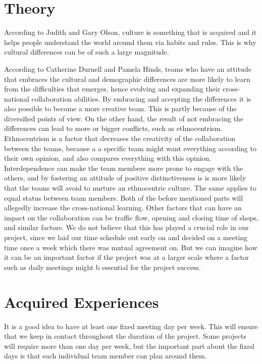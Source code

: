 \section{Theory}

According to Judith and Gary Olson, culture is something that is acquired and it helps people understand the world around them via habits and rules. This is why cultural differences can be of such a large magnitude.
 
According to Catherine Durnell and Pamela Hinds, teams who have an attitude that embraces the cultural and demographic differences are more likely to learn from the difficulties that emerges, hence evolving and expanding their cross-national collaboration abilities. By embracing and accepting the differences it is also possible to become a more creative team. This is partly because of the diversified points of view. On the other hand, the result of not embracing the differences can lead to more or bigger conflicts, such as ethnocentrism. Ethnocentrism is a factor that decreases the creativity of the collaboration between the teams, because a a specific team might want everything according to their own opinion, and also compares everything with this opinion.
Interdependence can make the team members more prone to engage with the others, and by fostering an attitude of positive distinctiveness is is more likely that the teams will avoid to nurture an ethnocentric culture. The same applies to equal status between team members. Both of the before mentioned parts will allegedly increase the cross-national learning.
Other factors that can have an impact on the collaboration can be traffic flow, opening and closing time of shops, and similar factors. We do not believe that this has played a crucial role in our project, since we laid our time schedule out early on and decided on a meeting time once a week which there was mutual agreement on. But we can imagine how it can be an important factor if the project was at a larger scale where a factor such as daily meetings might b essential for the project success.


\section{Acquired Experiences}


It is a good idea to have at least one fixed meeting day per week. This will ensure that we keep in contact throughout the duration of the project. Some projects will require more than one day per week, but the important part about the fixed days is that each individual team member can plan around them.

